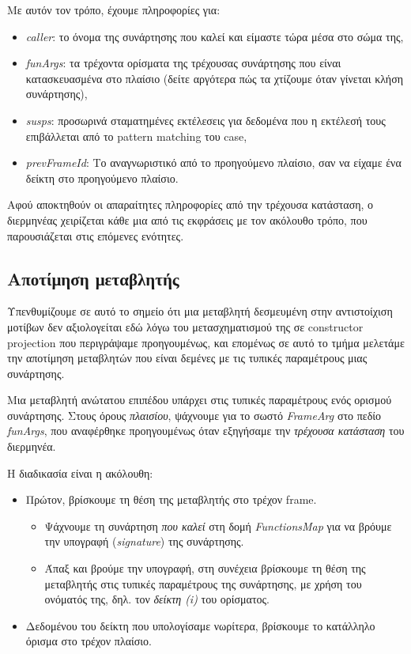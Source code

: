 \documentclass[diploma]{softlab-thesis}
\begin{document}
Με αυτόν τον τρόπο, έχουμε πληροφορίες για:
\begin{itemize}
  \item \textit{caller}: το όνομα της συνάρτησης που καλεί και είμαστε τώρα μέσα στο σώμα της,
  \item \textit{funArgs}: τα τρέχοντα ορίσματα της τρέχουσας συνάρτησης που είναι κατασκευασμένα στο πλαίσιο (δείτε αργότερα πώς τα χτίζουμε
  όταν γίνεται κλήση συνάρτησης),
  \item \textit{susps}: προσωρινά σταματημένες εκτέλεσεις για δεδομένα που η εκτέλεσή τους επιβάλλεται από το pattern matching του case, 
  \item \textit{prevFrameId}: Το αναγνωριστικό από το προηγούμενο πλαίσιο, σαν να είχαμε ένα δείκτη στο προηγούμενο πλαίσιο.
\end{itemize}

Αφού αποκτηθούν οι απαραίτητες πληροφορίες από την τρέχουσα κατάσταση, ο διερμηνέας χειρίζεται κάθε μια από τις εκφράσεις
με τον ακόλουθο τρόπο, που παρουσιάζεται στις επόμενες ενότητες.

\subsection{Αποτίμηση μεταβλητής}

Υπενθυμίζουμε σε αυτό το σημείο ότι μια μεταβλητή δεσμευμένη στην αντιστοίχιση μοτίβων δεν αξιολογείται εδώ 
λόγω του μετασχηματισμού της σε constructor projection που περιγράψαμε προηγουμένως, και επομένως σε αυτό το τμήμα μελετάμε 
την αποτίμηση μεταβλητών που είναι δεμένες με τις τυπικές παραμέτρους μιας συνάρτησης.

Μια μεταβλητή ανώτατου επιπέδου υπάρχει στις τυπικές παραμέτρους ενός ορισμού συνάρτησης. Στους όρους \textit{πλαισίου},
ψάχνουμε για το σωστό \textit{FrameArg} στο πεδίο \textit{funArgs}, που αναφέρθηκε προηγουμένως όταν εξηγήσαμε
την \textit{τρέχουσα κατάσταση} του διερμηνέα.

Η διαδικασία είναι η ακόλουθη:
\begin{itemize}
  \item Πρώτον, βρίσκουμε τη θέση της μεταβλητής στο τρέχον frame.
  \begin{itemize}
    \item Ψάχνουμε τη συνάρτηση \textit{που καλεί} στη δομή \textit{FunctionsMap} για να βρόυμε την υπογραφή
    (\textit{signature}) της συνάρτησης.
    \item Άπαξ και βρούμε την υπογραφή, στη συνέχεια βρίσκουμε τη θέση της μεταβλητής στις τυπικές παραμέτρους της συνάρτησης, με χρήση του ονόματός της, 
    δηλ. τον \textit{δείκτη (i)} του ορίσματος.
  \end{itemize} 
  \item Δεδομένου του δείκτη που υπολογίσαμε νωρίτερα, βρίσκουμε το κατάλληλο όρισμα στο τρέχον πλαίσιο.
\end{itemize}
\end{document}
